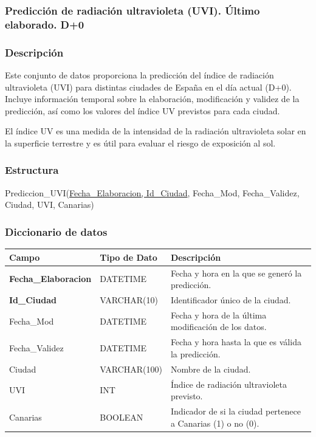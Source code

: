 \documentclass[12pt, a4paper]{article}
\begin{document}
\subsubsection{Predicción de radiación ultravioleta (UVI). Último elaborado. D+0}

\subsubsection*{Descripción}
Este conjunto de datos proporciona la predicción del índice de radiación ultravioleta (UVI) para distintas ciudades de España en el día actual (D+0). 
Incluye información temporal sobre la elaboración, modificación y validez de la predicción, así como los valores del índice UV previstos para cada ciudad.

El índice UV es una medida de la intensidad de la radiación ultravioleta solar en la superficie terrestre y es útil para evaluar el riesgo de exposición al sol.

\subsubsection*{Estructura}
Prediccion\_UVI(\underline{Fecha\_Elaboracion, Id\_Ciudad}, Fecha\_Mod, Fecha\_Validez, Ciudad, UVI, Canarias)

\subsubsection*{Diccionario de datos}
\begin{center}
\begin{tabular}{|p{}|p{}|p{}|}
\hline
\textbf{Campo} & \textbf{Tipo de Dato} & \textbf{Descripción} \\
\hline
\textbf{Fecha\_Elaboracion} & DATETIME & Fecha y hora en la que se generó la predicción. \\
\textbf{Id\_Ciudad} & VARCHAR(10) & Identificador único de la ciudad. \\
Fecha\_Mod & DATETIME & Fecha y hora de la última modificación de los datos. \\
Fecha\_Validez & DATETIME & Fecha y hora hasta la que es válida la predicción. \\
Ciudad & VARCHAR(100) & Nombre de la ciudad. \\
UVI & INT & Índice de radiación ultravioleta previsto. \\
Canarias & BOOLEAN & Indicador de si la ciudad pertenece a Canarias (1) o no (0). \\
\hline
\end{tabular}
\end{center}
\end{document}
